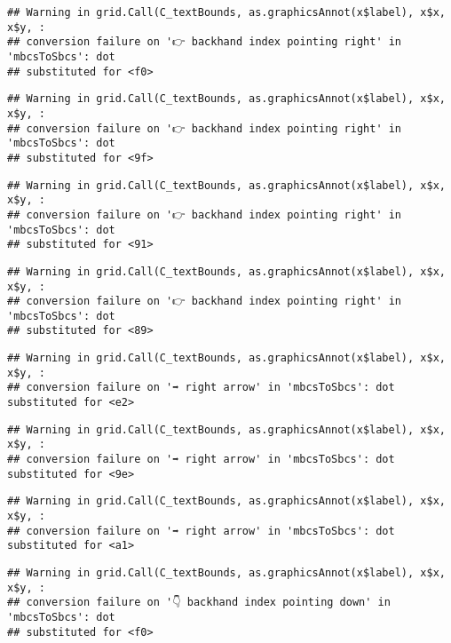 \documentclass[
]{article}
\begin{document}
\begin{verbatim}
## Warning in grid.Call(C_textBounds, as.graphicsAnnot(x$label), x$x, x$y, :
## conversion failure on '👉 backhand index pointing right' in 'mbcsToSbcs': dot
## substituted for <f0>
\end{verbatim}

\begin{verbatim}
## Warning in grid.Call(C_textBounds, as.graphicsAnnot(x$label), x$x, x$y, :
## conversion failure on '👉 backhand index pointing right' in 'mbcsToSbcs': dot
## substituted for <9f>
\end{verbatim}

\begin{verbatim}
## Warning in grid.Call(C_textBounds, as.graphicsAnnot(x$label), x$x, x$y, :
## conversion failure on '👉 backhand index pointing right' in 'mbcsToSbcs': dot
## substituted for <91>
\end{verbatim}

\begin{verbatim}
## Warning in grid.Call(C_textBounds, as.graphicsAnnot(x$label), x$x, x$y, :
## conversion failure on '👉 backhand index pointing right' in 'mbcsToSbcs': dot
## substituted for <89>
\end{verbatim}

\begin{verbatim}
## Warning in grid.Call(C_textBounds, as.graphicsAnnot(x$label), x$x, x$y, :
## conversion failure on '➡ right arrow' in 'mbcsToSbcs': dot substituted for <e2>
\end{verbatim}

\begin{verbatim}
## Warning in grid.Call(C_textBounds, as.graphicsAnnot(x$label), x$x, x$y, :
## conversion failure on '➡ right arrow' in 'mbcsToSbcs': dot substituted for <9e>
\end{verbatim}

\begin{verbatim}
## Warning in grid.Call(C_textBounds, as.graphicsAnnot(x$label), x$x, x$y, :
## conversion failure on '➡ right arrow' in 'mbcsToSbcs': dot substituted for <a1>
\end{verbatim}

\begin{verbatim}
## Warning in grid.Call(C_textBounds, as.graphicsAnnot(x$label), x$x, x$y, :
## conversion failure on '👇 backhand index pointing down' in 'mbcsToSbcs': dot
## substituted for <f0>
\end{verbatim}
\end{document}
